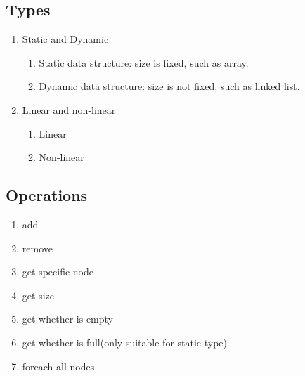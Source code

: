 \documentclass[12pt, a4paper]{report}
\begin{document}
        \subsection{Types}
        \begin{enumerate}
            \item Static and Dynamic 
            \begin{enumerate}
                \item Static data structure: size is fixed, such as array.
                \item Dynamic data structure: size is not fixed, such as linked list.
            \end{enumerate}
            \item Linear and non-linear
            \begin{enumerate}
                \item Linear
                \item Non-linear
            \end{enumerate}
        \end{enumerate}
        
        \subsection{Operations}
        \begin{enumerate}
            \item add
            \item remove
            \item get specific node
            \item get size
            \item get whether is empty
            \item get whether is full(only suitable for static type)
            \item foreach all nodes
        \end{enumerate}
    
\end{document}
